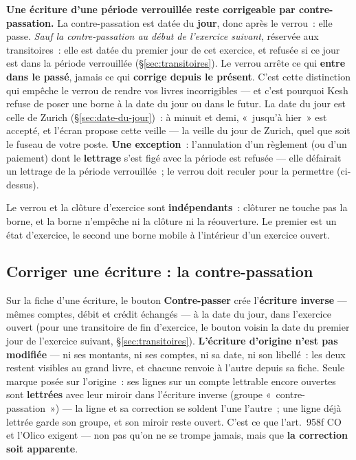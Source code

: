 \documentclass[a4paper,11pt,oneside]{article}
\begin{document}
\begin{keshwarning}[title={\faExclamationTriangle\ Ce que le verrou n'empêche pas, et c'est voulu}]
\textbf{Une écriture d'une période verrouillée reste corrigeable par contre-passation.} La
contre-passation est datée du \textbf{jour}, donc après le verrou~: elle passe. \emph{Sauf la
contre-passation au début de l'exercice suivant}, réservée aux transitoires~: elle est datée du
premier jour de cet exercice, et refusée si ce jour est dans la période verrouillée
(\S\ref{sec:transitoires}). Le verrou arrête
ce qui \textbf{entre dans le passé}, jamais ce qui \textbf{corrige depuis le présent}. C'est
cette distinction qui empêche le verrou de rendre vos livres incorrigibles --- et c'est pourquoi
Kesh refuse de poser une borne à la date du jour ou dans le futur. La date du jour est celle de
Zurich (\S\ref{sec:date-du-jour})~: à minuit et demi, «~jusqu'à hier~» est accepté, et l'écran
propose cette veille --- la veille du jour de Zurich, quel que soit le fuseau de votre poste.
\textbf{Une exception}~: l'annulation d'un règlement (ou d'un paiement) dont le
\textbf{lettrage} s'est figé avec la période est refusée --- elle défairait un lettrage de la
période verrouillée~; le verrou doit reculer pour la permettre (ci-dessus).
\end{keshwarning}

Le verrou et la clôture d'exercice sont \textbf{indépendants}~: clôturer ne touche pas la borne,
et la borne n'empêche ni la clôture ni la réouverture. Le premier est un état d'exercice, le
second une borne mobile à l'intérieur d'un exercice ouvert.

\subsection{Corriger une écriture : la contre-passation}\label{sec:contre-passation}

Sur la fiche d'une écriture, le bouton \textbf{Contre-passer} crée l'\textbf{écriture
inverse} --- mêmes comptes, débit et crédit échangés --- à la date du jour, dans l'exercice
ouvert (pour une transitoire de fin d'exercice, le bouton voisin la date du premier jour de
l'exercice suivant, \S\ref{sec:transitoires}). \textbf{L'écriture d'origine n'est pas modifiée} --- ni ses montants, ni ses comptes,
ni sa date, ni son libellé~: les deux restent visibles au grand livre, et chacune renvoie à
l'autre depuis sa fiche. Seule marque posée sur l'origine~: ses lignes sur un compte
lettrable encore ouvertes sont \textbf{lettrées} avec leur miroir dans l'écriture inverse
(groupe «~contre-passation~») --- la ligne et sa correction se soldent l'une l'autre~; une
ligne déjà lettrée garde son groupe, et son miroir reste ouvert. C'est ce que l'art.~958f CO et l'Olico
exigent --- non pas qu'on ne se trompe jamais, mais que \textbf{la correction soit
apparente}.
\end{document}
